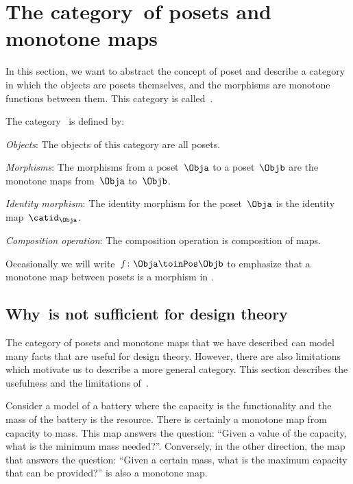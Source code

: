 \section{The category~\Pos of posets and monotone maps}
In this section, we want to abstract the concept of poset and describe a category in which the objects are posets themselves, and the morphisms are monotone functions between them. This category is called~\Pos.

\begin{ctdefinition}
  \label{def:Pos}
  The category~\iindex{\Pos} is defined by:
  \begin{compactenum}
    \item \emph{Objects}: The objects of this category are all posets.
    \item \emph{Morphisms}: The morphisms from a poset~$\Obja$ to a poset~$\Objb$ are the monotone maps from~$\Obja$ to~$\Objb$.
    \item \emph{Identity morphism}: The identity morphism for the poset~$\Obja$
    is the identity map~$\catid_\Obja$.
    \item \emph{Composition operation}: The composition operation is composition of maps.
  \end{compactenum}
\end{ctdefinition}

Occasionally we will write~$f \colon \Obja \toinPos \Objb$ to emphasize that a monotone map between posets is a morphism in \Pos.

\subsection{Why~\Pos is not sufficient for design theory}

The category \Pos of posets and monotone maps that we have described can model many facts that are useful for design theory. However, there are also limitations which motivate us to describe a more general category. This section describes the usefulness and the limitations of~\Pos.

\begin{example}[Battery]
  Consider a model of a battery where the capacity is the functionality and the mass of the battery is the resource.
  There is certainly a monotone map from capacity to mass. This map answers the question: ``Given a value of the capacity, what is the minimum mass needed?''. Conversely, in the other direction, the map that answers the question: ``Given a certain mass, what is the maximum capacity that can be provided?'' is also a monotone map.
\end{example}

